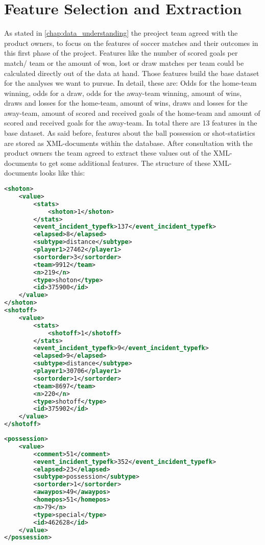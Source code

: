 
\chapter{Feature Selection and Extraction}
\label{chap:feature_selection_and_extraction}
As stated in \autoref{chap:data_understanding} the preoject team agreed with the product owners, to focus on the features of soccer matches and their outcomes in this first phase of the project. Features like the number of scored goals per match/ team or the amount of won, lost or draw matches per team could be calculated directly out of the data at hand. Those features build the base dataset for the analyses we want to pursue. In detail, these are: Odds for the home-team winning, odds for a draw, odds for the away-team winning, amount of wins, draws and losses for the home-team, amount of wins, draws and losses for the away-team, amount of scored and received goals of the home-team and amount of scored and received goals for the away-team. In total there are 13 features in the base dataset.
\newline
As said before, features about the ball possession or shot-statistics are stored as XML-documents within the database. After consultation with the product owners the team agreed to extract these values out of the XML-documents to get some additional features. The structure of these XML-documents looks like this:
\\
\begin{lstlisting}[language=XML, caption=XML structure of shot-statistics]
<shoton>
	<value>
		<stats>
			<shoton>1</shoton>
		</stats>
		<event_incident_typefk>137</event_incident_typefk>
		<elapsed>8</elapsed>
		<subtype>distance</subtype>
		<player1>27462</player1>
		<sortorder>3</sortorder>
		<team>9912</team>
		<n>219</n>
		<type>shoton</type>
		<id>375900</id>
	</value>
</shoton>
<shotoff>
	<value>
		<stats>
			<shotoff>1</shotoff>
		</stats>
		<event_incident_typefk>9</event_incident_typefk>
		<elapsed>9</elapsed>
		<subtype>distance</subtype>
		<player1>30706</player1>
		<sortorder>1</sortorder>
		<team>8697</team>
		<n>220</n>
		<type>shotoff</type>
		<id>375902</id>
	</value>
</shotoff>
\end{lstlisting}

\begin{lstlisting}[language=XML, caption=XML structure of ball-possession-statistics]
<possession>
	<value>
		<comment>51</comment>
		<event_incident_typefk>352</event_incident_typefk>
		<elapsed>23</elapsed>
		<subtype>possession</subtype>
		<sortorder>1</sortorder>
		<awaypos>49</awaypos>
		<homepos>51</homepos>
		<n>79</n>
		<type>special</type>
		<id>462628</id>
	</value>
</possession>
\end{lstlisting}

